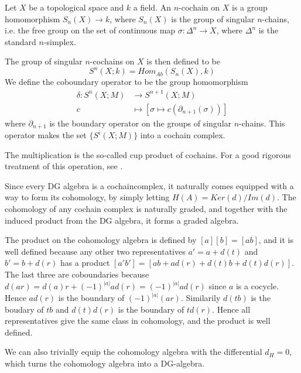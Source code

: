 \begin{example}
Let $X$ be a topological space and $k$ a field. An $n$-cochain on $X$ is a group homomorphism $S_n(X)\longrightarrow k$, where $S_n(X)$ is the group of singular $n$-chains, i.e. the free group on the set of continuous map $\sigma\colon\Delta^n\longrightarrow X$, where $\Delta^n$ is the standard $n$-simplex. 

The group of singular $n$-cochains on $X$ is then defined to be 
\begin{equation*}
S^n(X;k) = Hom_{Ab}(S_n(X), k)
\end{equation*}
We define the coboundary operator to be the group homomorphism
\begin{align*}
	\delta\colon S^n(X;M)&\longrightarrow S^{n+1}(X;M) \\
	c &\longmapsto [\sigma\mapsto c(\partial_{n+1}(\sigma))]
\end{align*}
where $\partial_{n+1}$ is the boundary operator on the groups of singular $n$-chains. This operator makes the set $\{S^i(X;M)\}$ into a cochain complex. 

The multiplication is the so-called cup product of cochains. For a good rigorous treatment of this operation, see \cite[Section 3.2.]{hatcher}. 
\end{example}

\begin{example}
Since every DG algebra is a cochaincomplex, it naturally comes equipped with a way to form its cohomology, by simply letting $H(A)=Ker(d)/Im(d)$. The cohomology of any cochain complex is naturally graded, and together with the induced product from the DG algebra, it forms a graded algebra. 
    
The product on the cohomology algebra is defined by $[a][b]=[ab]$, and it is well defined because any other two representatives $a'=a+d(t)$ and $b'=b+d(r)$ has a product $[a'b']=[ab+ad(r)+d(t)b+d(t)d(r)]$. The last three are coboundaries because $d(ar)=d(a)r + (-1)^{|a|}ad(r) = (-1)^{|a|}ad(r)$ since $a$ is a cocycle. Hence $ad(r)$ is the boundary of $(-1)^{|a|}(ar)$. Similarily $d(tb)$ is the boudary of $tb$ and $d(t)d(r)$ is the boundary of $td(r)$. Hence all representatives give the same class in cohomology, and the product is well defined. 
    
We can also trivially equip the cohomology algebra with the differential $d_H=0$, which turns the cohomology algebra into a DG-algebra. 
\label{ex:cohomology}
\end{example}


